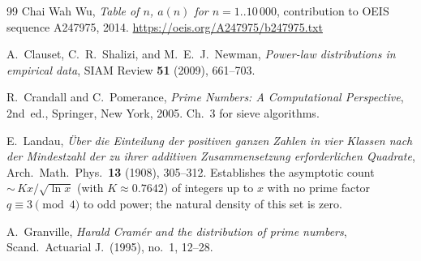 \documentclass{amsart}
\theoremstyle{definition}
\theoremstyle{remark}
\numberwithin{equation}{section}
\begin{document}
\begin{thebibliography}{99}
	Chai Wah Wu,
	\textit{Table of $n$, $a(n)$ for $n = 1..10\,000$},
	contribution to OEIS sequence A247975, 2014.
	\url{https://oeis.org/A247975/b247975.txt}

	A.~Clauset, C.~R.~Shalizi, and M.~E.~J.~Newman,
	\textit{Power-law distributions in empirical data},
	SIAM Review \textbf{51} (2009), 661--703.

	R.~Crandall and C.~Pomerance,
	\textit{Prime Numbers: A Computational Perspective},
	2nd~ed., Springer, New York, 2005.
	Ch.~3 for sieve algorithms.

	E.~Landau,
	\textit{\"Uber die Einteilung der positiven ganzen Zahlen in vier
		Klassen nach der Mindestzahl der zu ihrer additiven Zusammensetzung
		erforderlichen Quadrate},
	Arch.\ Math.\ Phys.\ \textbf{13} (1908), 305--312.
	Establishes the asymptotic count ${\sim}\,Kx/\sqrt{\ln x}$
	(with $K \approx 0.7642$) of integers up to $x$ with no prime factor
	$q \equiv 3 \pmod{4}$ to odd power; the natural density of this
	set is zero.

	A.~Granville,
	\textit{Harald Cram\'er and the distribution of prime numbers},
	Scand.\ Actuarial J.\ (1995), no.~1, 12--28.

\end{thebibliography}
\end{document}
